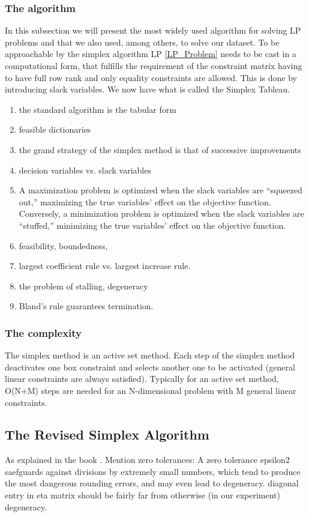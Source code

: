 \subsubsection{The algorithm}
In this subsection we will present the most widely used algorithm for solving
LP problems and that we also used, among others, to solve our dataset.
To be approachable by the simplex algorithm LP \ref*{LP_Problem} needs to be cast in a 
computational form, that fulfills the requirement of the constraint matrix having to have
full row rank and only equality  constraints are allowed. This is done by introducing slack
variables. 
We now have what is called the Simplex Tableau. 
\begin{enumerate}
    \item the standard algorithm is the tabular form
    \item feasible dictionaries
    \item the grand strategy of the simplex method is that of successive improvements
    \item decision variables vs. slack variables
    \item A maximization problem is optimized when the slack variables are “squeezed out,” maximizing the true variables’ effect on the objective function. Conversely, a minimization problem is optimized when the slack variables are “stuffed,” 
    minimizing the true variables’ effect on the objective function.
    \item feasibility, boundedness, 
    \item largest coefficient rule vs. largest increase rule.
    \item the problem of stalling, degeneracy
    \item Bland's rule guarantees termination.
    
\end{enumerate}

\subsubsection{The complexity}

The simplex method is an active set method.
Each step of the simplex method deactivates one box constraint and 
selects another one to be activated (general linear constraints are 
always satisfied).
Typically for an active set method, O(N+M) steps are needed for 
an N-dimensional problem with M general linear constraints.
\subsection{The Revised Simplex Algorithm}
As explained in the book \parencite*{chvatal1983linear}. 
Mention zero tolerances: A zero tolerance epsilon2 saefguards against divisions
by extremely small numbers, which tend to produce the most dangerous rounding errors, and 
may even lead to degeneracy. diagonal entry in eta matrix should be fairly far from
 otherwise (in our experiment) degeneracy.
